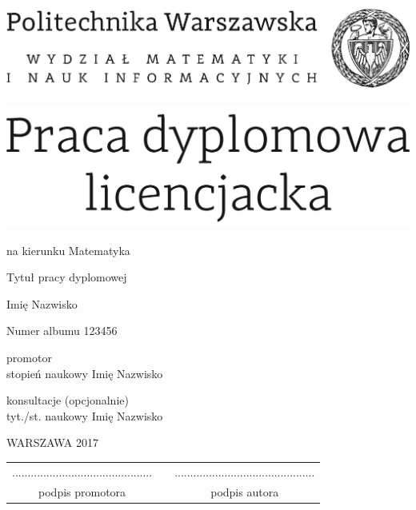 \documentclass[12pt,twoside,a4paper]{article}
\newcommand{\discipline}{Matematyka}
\renewcommand{\title}{Tytuł pracy dyplomowej}
\renewcommand{\author}{Imię Nazwisko}
\newcommand{\supervisor}{stopień naukowy Imię Nazwisko}
\newcommand{\album}{123456}
\renewcommand{\year}{2017}
\begin{document}
\pagestyle{empty}

\begin{center}
\includegraphics[scale=1.]{politechnika} 
\vspace{70pt}


\includegraphics[scale=1.]{praca_lic} %

{ \arial na kierunku \discipline

\vspace{40pt}
{\arial \large \title}

\vspace{50pt}

{\arial \huge \author}

\vspace{5pt}

Numer albumu \album

\vspace{40pt}

promotor \\
{\arial \supervisor}

\vspace{15pt}
 
konsultacje (opcjonalnie)  \\
{\arial tyt./st. naukowy Imię Nazwisko }

 \vfill
WARSZAWA \year \\
}
\end{center}


\newpage
\null

\vfill

\begin{center}
\begin{tabular}[t]{ccc}
............................................. & \hspace*{100pt} & .............................................\\
podpis promotora & \hspace*{100pt} & podpis autora
\end{tabular}
\end{center}
\end{document}

